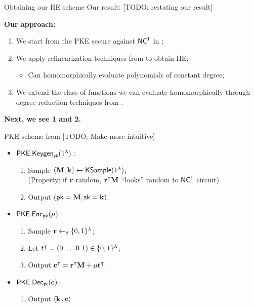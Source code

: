 \begin{frame}{Obtaining our HE scheme}
	Our result: [TODO: restating our result]
	
	\textbf{Our approach:}
	\begin{enumerate}
		\item We start from the PKE secure against ${\mathsf{NC}}^1$ in \cite{fgcrypto};
		\item We apply relinearization techniques from \cite{fhe-lwe} to obtain HE;
		\begin{itemize}
			\item Can homomorphically evaluate polynomials of constant degree; 
		\end{itemize}
		\item We extend the class of functions we can evaluate homomorphically through degree reduction techniques from \cite{razborov1987lower}.
	\end{enumerate}\pause
	\textbf{Next, we see 1 and 2.}
\end{frame}

\begin{frame}{PKE scheme from \cite{fgcrypto}}
	[TODO: Make more intuitive]
	\begin{itemize}
		\item $\mathsf{PKE.Keygen}_{\mathsf{sk}}(1^{\lambda}):$
		\begin{enumerate}
			\item Sample $(\mathbf{M}, \mathbf{k}) \gets \mathsf{KSample}(1^{\lambda})$;\\
			 {\color{red}(Property: if $\mathbf{r}$ random, ${\mathbf{r}}^{\intercal}  \mathbf{M}$ ``looks'' random to ${\mathsf{NC}}^1$ circuit)}
			\item Output $(\mathsf{pk} = \mathbf{M}, \mathsf{sk} = \mathbf{k})$.
		\end{enumerate}
		\item $\mathsf{PKE.Enc}_{\mathsf{pk}}(\mu):$
		\begin{enumerate}
			\item Sample $\mathbf{r} \leftarrow_{\$} \{0, 1\}^{\lambda}$;
			\item Let ${t}^{\intercal} = (0 \ \dots 0 \ 1) \in \{0, 1\}^{\lambda}$;
			\item Output ${\mathbf{c}}^{\intercal} = {\mathbf{r}}^{\intercal}  \mathbf{M} + \mu{\mathbf{t}}^{\intercal}$.
		\end{enumerate}
		\item $\mathsf{PKE.Dec}_{\mathsf{sk}}(\mathbf{c}):$
		\begin{enumerate}
			\item Output $\langle \mathbf{k} \, , \mathbf{c} \rangle$
		\end{enumerate}
		
	\end{itemize}
\end{frame}

